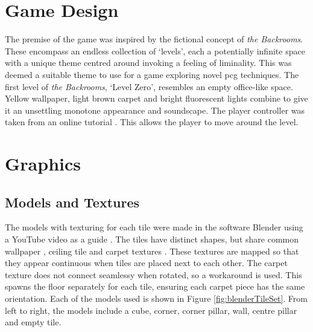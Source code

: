 
\section{Game Design}
The premise of the game was inspired by the fictional concept of \textit{the Backrooms}. These encompass an endless collection of `levels', each a potentially infinite space with a unique theme centred around invoking a feeling of liminality. This was deemed a suitable theme to use for a game exploring novel \acrlong{pcg} techniques. The first level of \textit{the Backrooms}, `Level Zero', resembles an empty office-like space. Yellow wallpaper, light brown carpet and bright fluorescent lights combine to give it an unsettling monotone appearance and soundscape. The player controller was taken from an online tutorial \cite{FPS_controller_YouTube, FPS_controller_GitHub}. This allows the player to move around the level.



\section{Graphics}
\subsection{Models and Textures}
The models with texturing for each tile were made in the software Blender using a YouTube video as a guide \cite{backroomsGraphics}. The tiles have distinct shapes, but share common wallpaper \cite{sketchfab_texture}, ceiling tile \cite{ceiling_texture} and carpet textures \cite{carpet_texture}. These textures are mapped so that they appear continuous when tiles are placed next to each other. The carpet texture does not connect seamlessy when rotated, so a workaround is used. This spawns the floor separately for each tile, ensuring each carpet piece has the same orientation. Each of the models used is shown in Figure \ref{fig:blenderTileSet}. From left to right, the models include a cube, corner, corner pillar, wall, centre pillar and empty tile.

